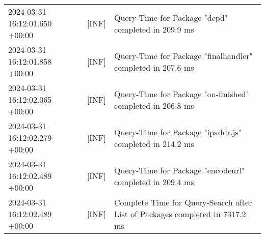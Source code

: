{{\begin{tabularx}{\textwidth}{|l|l|X|}
                    2024-03-31 16:12:01.650 +00:00 & [INF] & Query-Time for Package "depd" completed in 209.9 ms \\
                    2024-03-31 16:12:01.858 +00:00 & [INF] & Query-Time for Package "finalhandler" completed in 207.6 ms \\
                    2024-03-31 16:12:02.065 +00:00 & [INF] & Query-Time for Package "on-finished" completed in 206.8 ms \\
                    2024-03-31 16:12:02.279 +00:00 & [INF] & Query-Time for Package "ipaddr.js" completed in 214.2 ms \\
                    2024-03-31 16:12:02.489 +00:00 & [INF] & Query-Time for Package "encodeurl" completed in 209.4 ms \\
                    2024-03-31 16:12:02.489 +00:00 & [INF] & Complete Time for Query-Search after List of Packages completed in 7317.2 ms \\
                    \hline
                \end{tabularx}
            }
        }

